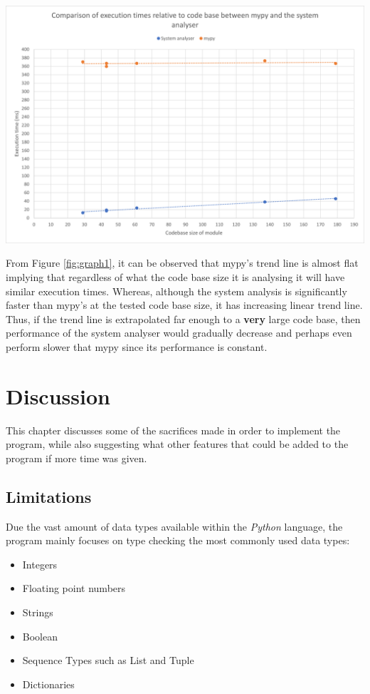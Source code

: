 \documentclass{l4proj}
\begin{document}
\begin{center}
    \includegraphics[width=\textwidth]{images/mypyG.png}
    \label{fig:graph1}
\end{center}

From Figure \ref{fig:graph1}, it can be observed that mypy's trend line is almost flat implying that regardless of what the code base size it is analysing it will have similar execution times. Whereas, although the system analysis is significantly faster than mypy's at the tested code base size, it has increasing linear trend line. Thus, if the trend line is extrapolated far enough to a \textbf{very} large code base, then performance of the system analyser would gradually decrease and perhaps even perform slower that mypy since its performance is constant. 
\chapter{Discussion}    
This chapter discusses some of the sacrifices made in order to implement the program, while also suggesting what other features that could be added to the program if more time was given.

\section{Limitations}
Due the vast amount of data types available within the \emph{Python} language, the program mainly focuses on type checking the most commonly used data types:
\begin{itemize}
    \item Integers
    \item Floating point numbers 
    \item Strings
    \item Boolean
    \item Sequence Types such as List and Tuple
    \item Dictionaries
\end{itemize}
\end{document}
